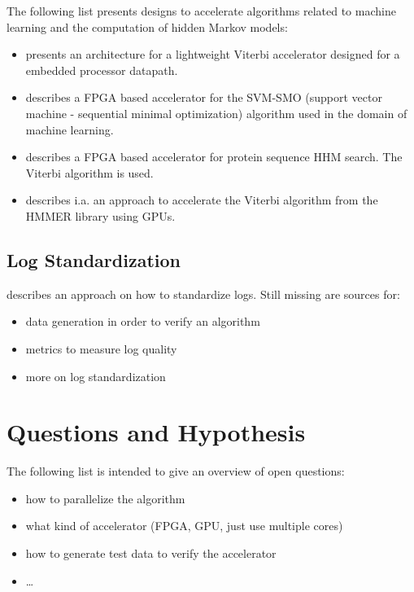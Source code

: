 \documentclass[12pt]{article} %
\begin{document}
The following list presents designs to accelerate algorithms related to machine
learning and the computation of hidden Markov models:
\begin{itemize}
    \item \cite{ASAP12_Azhar} presents an architecture for a lightweight Viterbi
        accelerator designed for a embedded processor datapath.
    \item \cite{FCCM09_Cadambi} describes a FPGA based accelerator for the
        SVM-SMO (support vector machine - sequential minimal optimization)
        algorithm used in the domain of machine learning.
    \item \cite{IPDPS07_Jacob,ICS06_Maddimsetty,IPDPS07_Oliver} describes a FPGA
        based accelerator for protein sequence HHM search. The Viterbi algorithm
        is used.
    \item \cite{IPDPS09_Walters} describes i.a. an approach to accelerate the
        Viterbi algorithm from the HMMER library using GPUs.
\end{itemize}


\subsection{Log Standardization} %

\cite{IPDPS04_Salfner} describes an approach on how to standardize logs. Still
missing are sources for:
\begin{itemize}
    \item data generation in order to verify an algorithm
    \item metrics to measure log quality
    \item more on log standardization
\end{itemize}


\section{Questions and Hypothesis} %

The following list is intended to give an overview of open questions:
\begin{itemize}
    \item how to parallelize the algorithm
    \item what kind of accelerator (FPGA, GPU, just use multiple cores)
    \item how to generate test data to verify the accelerator
    \item \dots
\end{itemize}
\end{document}
